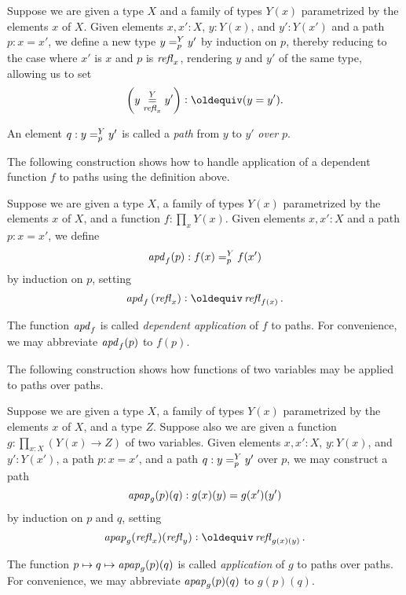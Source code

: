 \begin{definition}\label{def:pathsoverpaths}
  Suppose we are given a type $X$ and a family of types $Y(x)$ parametrized by the elements $x$ of $X$.  Given elements $x,x':X$, $y:Y(x)$, and
  $y':Y(x')$ and a path $p : x = x'$, we define a new type $y =^{Y}_{p} y'$ by induction on $p$, thereby reducing to the case
  where $x'$ is $x$ and $p$ is $\mathop{{\it refl}_{x}}$,
  rendering $y$ and $y'$ of the same type,
  allowing us to set $$\left( \pathoverdisplay y Y {\refl x} {y'} \right) \defeq (y = y').$$
\end{definition}

An element $q : y =^{Y}_{p} y'$ is called a {\em path} from $y$ to $y'$ {\em over} $p$.

The following construction shows how to handle application of a dependent 
function $f$ to paths using the definition above.

\begin{definition}\label{def:apd}
  Suppose we are given a type $X$, a family of types $Y(x)$ parametrized by the elements $x$ of $X$, and a function $f:\prod_x Y(x)$.
  Given elements $x,x':X$ and a path $p : x = x'$, we define $$\mathop{{\it apd}_{f}}(p) : f(x) =^{Y}_{p} f(x')$$ by induction on $p$,
  setting $$\apd f {(\refl x)} \defeq \refl {f(x)}.$$
\end{definition}

The function $\mathop{{\it apd}_{f}}$ is called {\em dependent application} of $f$ to paths.  For convenience, we may abbreviate $\mathop{{\it apd}_{f}} (p)$ to $f(p)$.

The following construction shows how functions of two variables may be applied to paths over paths.

\begin{definition}\label{def:applfun2}
  Suppose we are given a type $X$, a family of types $Y(x)$ parametrized by the elements $x$ of $X$, and a type $Z$.
  Suppose also we are given a function $g : \prod_{x:X} (Y(x) \to Z)$ of two variables.
  Given elements $x,x':X$, $y:Y(x)$, and
  $y':Y(x')$, a path $p : x = x'$, and a path $q :y =^{Y}_{p} y'$ over $p$,
  we may construct a path $$\mathop{{\it apap}_{g}(p)(q)} : g(x)(y) = g(x')(y')$$ by induction on $p$ and $q$,
  setting $$\apap g {\refl x}{\refl y} \defeq \refl {g(x)(y)}.$$
\end{definition}

The function $p \mapsto q \mapsto \mathop{{\it apap}_{g}(p)(q)}$ is called {\em application} of $g$ to paths over paths.
For convenience, we may abbreviate $\mathop{{\it apap}_{g}(p)(q)}$ to $g(p)(q)$.

